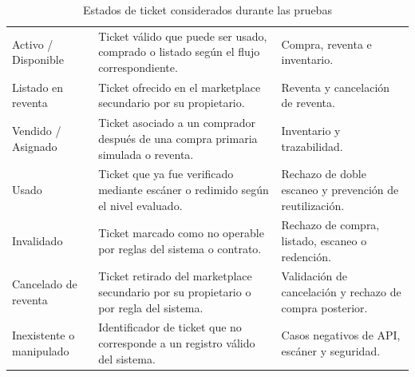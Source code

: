 \documentclass[12pt,letterpaper]{article}
\begin{document}
\begin{table}[H]
\centering

\begingroup
\scriptsize
\setlength{\tabcolsep}{3pt}
\renewcommand{\arraystretch}{1.22}

\begin{tabularx}{\textwidth}{|
>{\raggedright\arraybackslash}p{3.4cm}|
>{\raggedright\arraybackslash}X|
>{\raggedright\arraybackslash}p{4.7cm}|}
\hline
\multicolumn{1}{|>{\centering\arraybackslash}m{3.4cm}|}{\textbf{Estado}} &
\multicolumn{1}{>{\centering\arraybackslash}m{6.3cm}|}{\textbf{Descripción}} &
\multicolumn{1}{>{\centering\arraybackslash}m{4.7cm}|}{\textbf{Uso en pruebas}} \\
\hline

Activo / Disponible &
Ticket válido que puede ser usado, comprado o listado según el flujo correspondiente. &
Compra, reventa e inventario. \\
\hline

Listado en reventa &
Ticket ofrecido en el marketplace secundario por su propietario. &
Reventa y cancelación de reventa. \\
\hline

Vendido / Asignado &
Ticket asociado a un comprador después de una compra primaria simulada o reventa. &
Inventario y trazabilidad. \\
\hline

Usado &
Ticket que ya fue verificado mediante escáner o redimido según el nivel evaluado. &
Rechazo de doble escaneo y prevención de reutilización. \\
\hline

Invalidado &
Ticket marcado como no operable por reglas del sistema o contrato. &
Rechazo de compra, listado, escaneo o redención. \\
\hline

Cancelado de reventa &
Ticket retirado del marketplace secundario por su propietario o por regla del sistema. &
Validación de cancelación y rechazo de compra posterior. \\
\hline

Inexistente o manipulado &
Identificador de ticket que no corresponde a un registro válido del sistema. &
Casos negativos de API, escáner y seguridad. \\
\hline

\end{tabularx}

\endgroup

\caption{Estados de ticket considerados durante las pruebas}
\label{tab:estados-ticket-pruebas}
\end{table}
\end{document}
